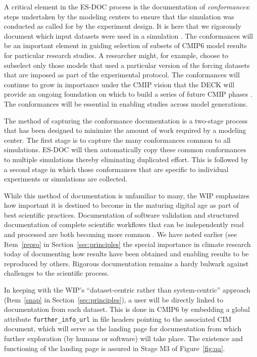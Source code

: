 \documentclass[gmd,manuscript]{copernicus}
\newcommand{\figref}[1] {\mbox{Figure   \ref{fig:#1}}}
\newcommand{\secref}[1] {\mbox{Section  \ref{sec:#1}}}
\begin{document}
A critical element in the ES-DOC process is the documentation of
\emph{conformances}: steps undertaken by the modeling centers to
ensure that the simulation was conducted as called for by the
experiment design. It is here that we rigorously document which input
datasets were used in a simulation \citep[e.g., the version of each of
the forcing datasets, see][]{ref:duracketal2017}. The conformances
will be an important element in guiding selection of subsets of CMIP6
model results for particular research studies. A researcher might, for
example, choose to subselect only those models that used a particular
version of the forcing datasets that are imposed as part of the
experimental protocol. The conformances will continue to grow in
importance under the CMIP vision that the DECK will provide an ongoing
foundation on which to build a series of future CMIP phases
\citep[shown schematically in Figure~1 of][]{ref:eyringetal2016a}. The
conformances will be essential in enabling studies across model
generations.

The method of capturing the conformance documentation is a two-stage
process that has been designed to minimize the amount of work required
by a modeling center. The first stage is to capture the many
conformances common to all simulations. ES-DOC will then automatically
copy these common conformances to multiple simulations thereby
eliminating duplicated effort. This is followed by a second stage in
which those conformances that are specific to individual experiments
or simulations are collected.

While this method of documentation is unfamiliar to many, the WIP
emphasizes how important it is destined to become in the maturing
digital age as part of best scientific practices. Documentation of
software validation \citep[see e.g][]{ref:peng2011} and structured
documentation of complete scientific workflows that can be
independently read and processed are both becoming more common
\citep[see the special issue on the ``Geoscience Paper of the
Future'', ][]{ref:davidetal2016}. We have noted earlier (see
Item~\ref{repro} in \secref{principles} the special importance in
climate research today of documenting how results have been obtained
and enabling results to be reproduced by others. Rigorous
documentation remains a hardy bulwark against challenges to the
scientific process.

In keeping with the WIP's ``dataset-centric rather than
system-centric'' approach (Item~\ref{snap} in \secref{principles}), a
user will be directly linked to documentation from each dataset. This
is done in CMIP6 by embedding a global attribute
\texttt{further\_info\_url} in file headers pointing to the associated
CIM document, which will serve as the landing page for documentation
from which further exploration (by humans or software) will take
place. The existence and functioning of the landing page is assured in
Stage M3 of \figref{qa}.
\end{document}
